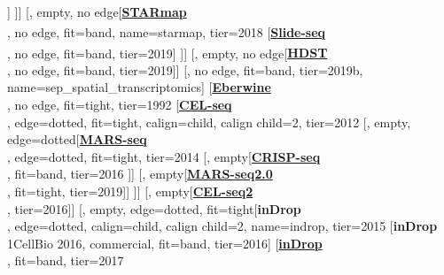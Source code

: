 \documentclass[12pt, a4]{article}
\begin{document}
\begin{center}
\begin{forest}
			[\href{https://www.nature.com/articles/s41598-019-43943-8}{\textbf{Branched\textsuperscript{\large{\textmu}}}}\\\href{https://www.nature.com/articles/s41598-019-43943-8}{\textbf{MERFISH}}\\\citealt{xia2019}, fit=tight, tier=2019]
		]
	]]
	[, empty, no edge[\href{https://science.sciencemag.org/content/361/6400/eaat5691}{\textbf{STARmap\textsuperscript{\large{\textmu}}}}\\\citealt{wang2018b}, no edge, fit=band, name=starmap, tier=2018
			[\href{https://science.sciencemag.org/content/363/6434/1463}{\textbf{Slide-seq\textsuperscript{\large{\textmu}}}}\\\citealt{rodriques2019}, no edge, fit=band, tier=2019]
	]]
	[, empty, no edge[\href{https://www.nature.com/articles/s41592-019-0548-y}{\textbf{HDST\textsuperscript{\large{\textmu}}}}\\\citealt{vickovic2019}, no edge, fit=band, tier=2019]]
	[, no edge, fit=band, tier=2019b, name=sep_spatial_transcriptomics]
	[\href{https://www.pnas.org/content/89/7/3010}{\textbf{Eberwine}}\\\citealt{eberwine1992}, no edge, fit=tight, tier=1992
	[\href{https://www.cell.com/cell-reports/fulltext/S2211-1247(12)00228-8}{\textbf{CEL-seq}}\\\citealt{hashimshony2012}, edge=dotted, fit=tight, calign=child, calign child=2, tier=2012
		[, empty, edge=dotted[\href{https://science.sciencemag.org/content/343/6172/776}{\textbf{MARS-seq}}\\\citealt{jaitin2014}, edge=dotted, fit=tight, tier=2014
			[, empty[\href{https://linkinghub.elsevier.com/retrieve/pii/S0092-8674(16)31611-7}{\textbf{CRISP-seq}}\\\citealt{jaitin2016}, fit=band, tier=2016
			]]
			[, empty[\href{https://www.nature.com/articles/s41596-019-0164-4}{\textbf{MARS-seq2.0}}\\\citealt{keren-shaul2019}, fit=tight, tier=2019]]
		]]
		[, empty[\href{https://genomebiology.biomedcentral.com/articles/10.1186/s13059-016-0938-8}{\textbf{CEL-seq2}}\\\citealt{hashimshony2016}, tier=2016]]
		[, empty, edge=dotted, fit=tight[\textbf{inDrop}\\\citealt{klein2015}, edge=dotted, calign=child, calign child=2, name=indrop, tier=2015
			[\textbf{inDrop}\\1CellBio 2016, commercial, fit=band,  tier=2016]
			[\href{https://www.nature.com/articles/nprot.2016.154}{\textbf{inDrop}}\\\citealt{zilionis2017}, fit=band, tier=2017

\end{forest}
\end{center}
\end{document}
